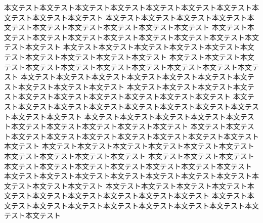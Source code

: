 \documentclass[uplatex,dvipdfmx,a4paper,twocolumn,base=11pt,jbase=11pt,js=standard]{bxjsarticle}
\begin{document}
本文テスト本文テスト本文テスト本文テスト本文テスト本文テスト本文テスト本文テスト本文テスト本文テスト
本文テスト本文テスト本文テスト本文テスト本文テスト本文テスト本文テスト本文テスト本文テスト本文テスト
本文テスト本文テスト本文テスト本文テスト本文テスト本文テスト本文テスト本文テスト本文テスト本文テスト
本文テスト本文テスト本文テスト本文テスト本文テスト本文テスト本文テスト本文テスト本文テスト本文テスト
本文テスト本文テスト本文テスト本文テスト本文テスト本文テスト本文テスト本文テスト本文テスト本文テスト
本文テスト本文テスト本文テスト本文テスト本文テスト本文テスト本文テスト本文テスト本文テスト本文テスト
本文テスト本文テスト本文テスト本文テスト本文テスト本文テスト本文テスト本文テスト本文テスト本文テスト
本文テスト本文テスト本文テスト本文テスト本文テスト本文テスト本文テスト本文テスト本文テスト本文テスト
本文テスト本文テスト本文テスト本文テスト本文テスト本文テスト本文テスト本文テスト本文テスト本文テスト
本文テスト本文テスト本文テスト本文テスト本文テスト本文テスト本文テスト本文テスト本文テスト本文テスト
本文テスト本文テスト本文テスト本文テスト本文テスト本文テスト本文テスト本文テスト本文テスト本文テスト
本文テスト本文テスト本文テスト本文テスト本文テスト本文テスト本文テスト本文テスト本文テスト本文テスト
本文テスト本文テスト本文テスト本文テスト本文テスト本文テスト本文テスト本文テスト本文テスト本文テスト
本文テスト本文テスト本文テスト本文テスト本文テスト本文テスト本文テスト本文テスト本文テスト本文テスト
本文テスト本文テスト本文テスト本文テスト本文テスト本文テスト本文テスト本文テスト本文テスト本文テスト
\end{document}
